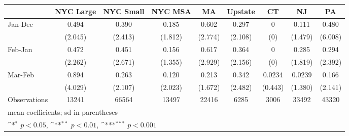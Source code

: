 {
\def\sym#1{\ifmmode^{#1}\else\(^{#1}\)\fi}
\begin{tabular}{l*{8}{c}}
\hline\hline
                    &\multicolumn{1}{c}{NYC Large}&\multicolumn{1}{c}{NYC Small}&\multicolumn{1}{c}{NYC MSA}&\multicolumn{1}{c}{MA}&\multicolumn{1}{c}{Upstate}&\multicolumn{1}{c}{CT}&\multicolumn{1}{c}{NJ}&\multicolumn{1}{c}{PA}\\
\hline
Jan-Dec             &       0.494         &       0.390         &       0.185         &       0.602         &       0.297         &           0         &       0.111         &       0.480         \\
                    &     (2.045)         &     (2.413)         &     (1.812)         &     (2.774)         &     (2.108)         &         (0)         &     (1.479)         &     (6.008)         \\
[1em]
Feb-Jan             &       0.472         &       0.451         &       0.156         &       0.617         &       0.364         &           0         &       0.285         &       0.294         \\
                    &     (2.262)         &     (2.671)         &     (1.355)         &     (2.929)         &     (2.156)         &         (0)         &     (1.819)         &     (2.392)         \\
[1em]
Mar-Feb             &       0.894         &       0.263         &       0.120         &       0.213         &       0.342         &      0.0234         &      0.0239         &       0.166         \\
                    &     (4.029)         &     (2.107)         &     (2.023)         &     (1.672)         &     (2.482)         &     (0.443)         &     (1.380)         &     (2.141)         \\
\hline
Observations        &       13241         &       66564         &       13497         &       22416         &        6285         &        3006         &       33492         &       43320         \\
\hline\hline
\multicolumn{9}{l}{\footnotesize mean coefficients; sd in parentheses}\\
\multicolumn{9}{l}{\footnotesize \sym{*} \(p<0.05\), \sym{**} \(p<0.01\), \sym{***} \(p<0.001\)}\\
\end{tabular}
}
